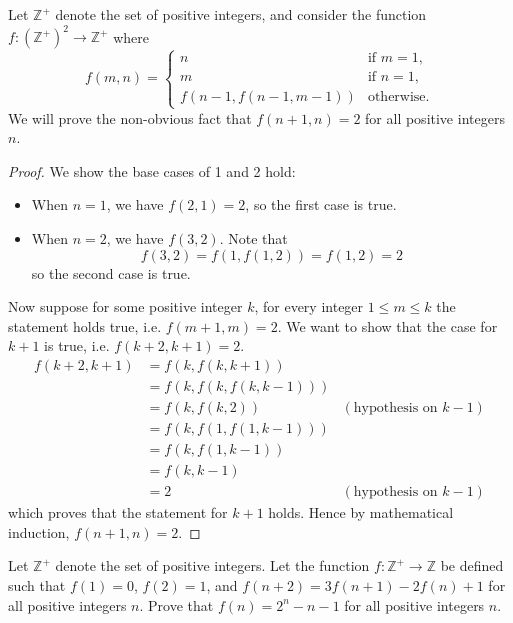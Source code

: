 \begin{example}
    Let $\mathbb{Z}^+$ denote the set of positive integers, and consider the function $f: \left(\mathbb{Z}^+\right)^2\to\mathbb{Z}^+$ where
    \[
        f(m, n) =
        \begin{cases}
            n & \text{if } m = 1, \\
            m & \text{if } n = 1, \\
            f\left(n-1,f(n-1,m-1)\right) & \text{otherwise.}
        \end{cases}
    \]
    We will prove the non-obvious fact that $f(n+1, n) = 2$ for all positive integers $n$.
    \begin{proof}
        We show the base cases of 1 and 2 hold:
        \begin{itemize}
            \item When $n = 1$, we have $f(2, 1) = 2$, so the first case is true.
            \item When $n = 2$, we have $f(3, 2)$. Note that
            \[
                f(3,2) = f(1, f(1, 2)) = f(1, 2) = 2
            \]
            so the second case is true.
        \end{itemize}
        
        Now suppose for some positive integer $k$, for every integer $1 \leq m \leq k$ the statement holds true, i.e. $f(m+1,m) = 2$. We want to show that the case for $k+1$ is true, i.e. $f(k+2, k+1) = 2$.
        \begin{align*}
            f(k+2, k+1) &= f(k, f(k, k+1))\\
            &= f(k, f(k, f(k, k-1)))\\
            &= f(k, f(k, 2)) & (\text{hypothesis on } k-1)\\
            &= f(k, f(1, f(1, k-1)))\\
            &= f(k, f(1, k-1))\\
            &= f(k, k-1) \\
            &= 2 & (\text{hypothesis on } k-1)
        \end{align*}
        which proves that the statement for $k+1$ holds. Hence by mathematical induction, $f(n+1, n) = 2$.
    \end{proof}
\end{example}

\begin{exercise}
    Let $\mathbb{Z}^+$ denote the set of positive integers. Let the function $f: \mathbb{Z}^+ \to \mathbb{Z}$ be defined such that $f(1) = 0$, $f(2) = 1$, and $f(n+2) = 3f(n+1) - 2f(n) + 1$ for all positive integers $n$. Prove that $f(n) = 2^n - n - 1$ for all positive integers $n$.
\end{exercise}

